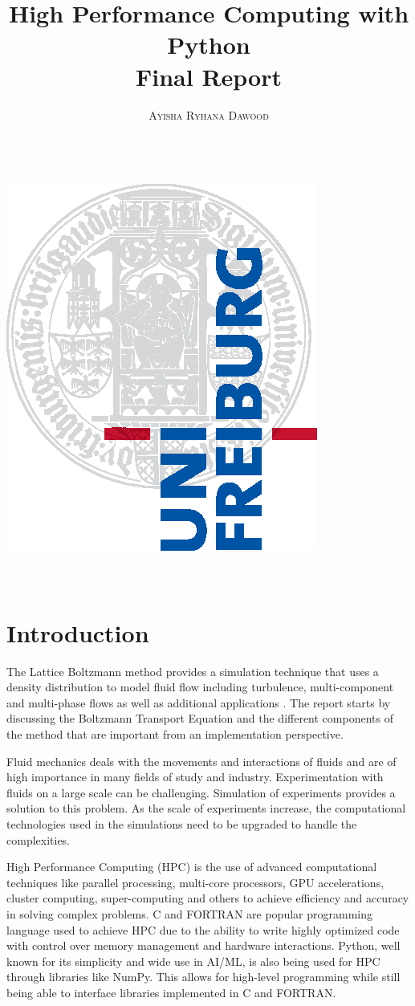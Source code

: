 \documentclass[a4paper,11pt]{report}
\title{\Huge \textbf{High Performance Computing with Python} \vspace{4mm} \\ \huge Final Report}
\author{\textsc{Ayisha Ryhana Dawood} \\ \vspace{3mm}\text{5653447}  \\
\vspace{3mm}\text{dawooda@informatik.uni-freiburg.de}}
\begin{document}
\makeatletter
    \begin{titlepage}
        \begin{center}
            \includegraphics[width=0.5\linewidth]{logos/Uni_Logo-Grundversion_E1_A4_CMYK.eps}\\[4ex]
            {\huge \bfseries  \@title }\\[2ex] 
            {\LARGE  \@author}\\[30ex] 
            {\large \@date}
        \end{center}
    \end{titlepage}
\makeatother
\thispagestyle{empty}
\newpage



\tableofcontents


\chapter{Introduction}
The Lattice Boltzmann method provides a simulation technique that uses a 
density distribution to model fluid flow including turbulence, multi-component and multi-phase
flows as well as additional applications \cite{lbm_intro}. The report starts by discussing the Boltzmann Transport Equation and the different components of the method that are important from an implementation perspective.

Fluid mechanics deals with the movements and interactions of fluids and are of high importance in many fields of study and industry. Experimentation with fluids on a large scale can be challenging. Simulation of experiments provides a solution to this problem. As the scale of experiments increase, the computational technologies used in the simulations need to be upgraded to handle the complexities. 

High Performance Computing (HPC) is the use of advanced computational techniques like parallel processing, multi-core processors, GPU accelerations, cluster computing, super-computing and others to achieve efficiency and accuracy in solving complex problems. C and FORTRAN are popular programming language used to achieve HPC due to the ability to write highly optimized code with control over memory management and hardware interactions. Python, well known for its simplicity and wide use in AI/ML, is also being used for HPC through libraries like NumPy. This allows for high-level programming while still being able to interface libraries implemented in C and FORTRAN.
\end{document}
